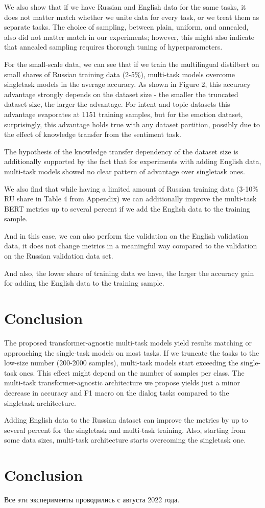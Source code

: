 We also show that if we have Russian and English data for the same tasks, it does not matter match whether we unite data for every task, or we treat them as separate tasks. The choice of sampling, between plain, uniform, and annealed, also did not matter match in our experiments; however, this might also indicate that annealed sampling requires thorough tuning of hyperparameters.

For the small-scale data, we can see that if we train the multilingual distilbert on small shares of Russian training data (2-5\%), multi-task models overcome singletask models in the average accuracy. As shown in Figure 2, this accuracy advantage strongly depends on the dataset size - the smaller the truncated dataset size, the larger the advantage. For intent and topic datasets this advantage evaporates at 1151 training samples, but for the emotion dataset, surprisingly, this advantage holds true with any dataset partition, possibly due to the effect of knowledge transfer from the sentiment task.

The hypothesis of the knowledge transfer dependency of the dataset size is additionally supported by the fact that for experiments with adding English data, multi-task models showed no clear pattern of advantage over singletask ones.

We also find that while having a limited amount of Russian training data (3-10\% RU share in Table 4 from Appendix)  we can additionally improve the multi-task BERT metrics up to several percent if we add the English data to the training sample. 

And in this case, we can also perform the validation on the English validation data, it does not change metrics in a meaningful way compared to the validation on the Russian validation data set. 

And also, the lower share of training data we have, the larger the accuracy gain for adding the English data to the training sample.


\section{Conclusion}

The proposed transformer-agnostic multi-task models yield results matching or approaching the single-task models on most tasks. If we truncate the tasks to the low-size number (200-2000 samples), multi-task models start exceeding the single-task ones. This effect might depend on the number of samples per class.
\fi
The multi-task transformer-agnostic architecture we propose yields just a minor decrease in accuracy and F1 macro on the dialog tasks compared to the singletask architecture. 

Adding English data to the Russian dataset can improve the metrics by up to several percent for the singletask and multi-task training. Also, starting from some data sizes, multi-task architecture starts overcoming the singletask one.


\section{Conclusion}



Все эти эксперименты проводились с августа 2022 года.
